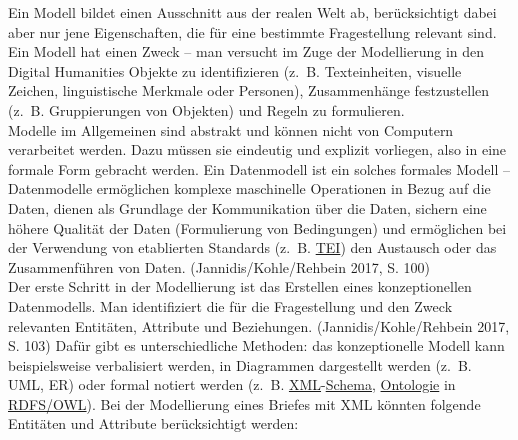 \documentclass{article}
\begin{document}
    Ein Modell bildet einen Ausschnitt aus der realen Welt ab, berücksichtigt dabei
                  aber nur jene Eigenschaften, die für eine bestimmte Fragestellung relevant sind.
                  Ein Modell hat einen Zweck – man versucht im Zuge der Modellierung in den Digital
                  Humanities Objekte zu identifizieren (z. B. Texteinheiten, visuelle Zeichen,
                  linguistische Merkmale oder Personen), Zusammenhänge festzustellen (z. B.
                  Gruppierungen von Objekten) und Regeln zu formulieren.\\
            
        Modelle im Allgemeinen sind abstrakt und können nicht von Computern verarbeitet
                  werden. Dazu müssen sie eindeutig und explizit vorliegen, also in eine formale
                  Form gebracht werden. Ein Datenmodell ist ein solches formales Modell –
                  Datenmodelle ermöglichen komplexe maschinelle Operationen in Bezug auf die Daten,
                  dienen als Grundlage der Kommunikation über die Daten, sichern eine höhere
                  Qualität der Daten (Formulierung von Bedingungen) und ermöglichen bei der
                  Verwendung von etablierten Standards (z. B. \href{http://gams.uni-graz.at/o:konde.178}{TEI}) den Austausch oder das Zusammenführen von
                  Daten. (Jannidis/Kohle/Rehbein 2017, S. 100)\\
            
        Der erste Schritt in der Modellierung ist das Erstellen eines konzeptionellen
                  Datenmodells. Man identifiziert die für die Fragestellung und den Zweck relevanten
                  Entitäten, Attribute und Beziehungen. (Jannidis/Kohle/Rehbein 2017, S.
                     103) Dafür gibt es unterschiedliche Methoden: das konzeptionelle Modell
                  kann beispielsweise verbalisiert werden, in Diagrammen dargestellt werden (z. B.
                  UML, ER) oder formal notiert werden (z. B. \href{http://gams.uni-graz.at/o:konde.215}{XML}-\href{http://gams.uni-graz.at/o:konde.166}{Schema}, \href{http://gams.uni-graz.at/o:konde.151}{Ontologie} in
                     \href{http://gams.uni-graz.at/o:konde.131}{RDFS/OWL}). Bei der
                  Modellierung eines Briefes mit XML könnten folgende Entitäten und Attribute
                  berücksichtigt werden:\\
            
\end{document}
